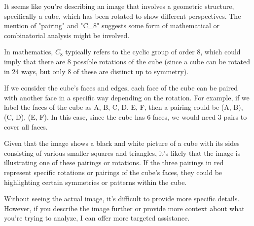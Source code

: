 It seems like you're describing an image that involves a geometric structure, specifically a cube, which has been rotated to show different perspectives. The mention of "pairing" and "C_8" suggests some form of mathematical or combinatorial analysis might be involved.

In mathematics, \(C_8\) typically refers to the cyclic group of order 8, which could imply that there are 8 possible rotations of the cube (since a cube can be rotated in 24 ways, but only 8 of these are distinct up to symmetry).

If we consider the cube's faces and edges, each face of the cube can be paired with another face in a specific way depending on the rotation. For example, if we label the faces of the cube as A, B, C, D, E, F, then a pairing could be (A, B), (C, D), (E, F). In this case, since the cube has 6 faces, we would need 3 pairs to cover all faces.

Given that the image shows a black and white picture of a cube with its sides consisting of various smaller squares and triangles, it's likely that the image is illustrating one of these pairings or rotations. If the three pairings in red represent specific rotations or pairings of the cube's faces, they could be highlighting certain symmetries or patterns within the cube.

Without seeing the actual image, it's difficult to provide more specific details. However, if you describe the image further or provide more context about what you're trying to analyze, I can offer more targeted assistance.